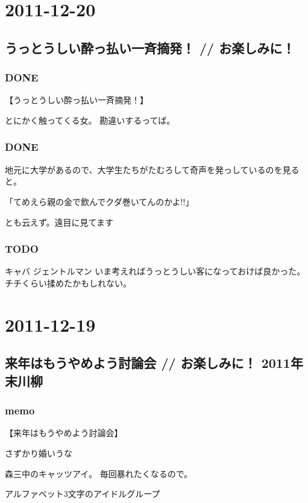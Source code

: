 \documentclass[11pt]{article}
\begin{document}
\section{2011-12-20}
\label{sec-18}
\subsection{うっとうしい酔っ払い一斉摘発！ // お楽しみに！}
\label{sec-18_1}
\subsubsection{\textbf{DONE}}
\label{sec-18_1_1}

【うっとうしい酔っ払い一斉摘発！】

とにかく触ってくる女。
勘違いするってば。
\subsubsection{\textbf{DONE}}
\label{sec-18_1_2}

地元に大学があるので、大学生たちがたむろして奇声を発っしているのを見ると。

「てめえら親の金で飲んでクダ巻いてんのかよ!!」

とも云えず。遠目に見てます
\subsubsection{\textbf{TODO}}
\label{sec-18_1_3}

キャバ
ジェントルマン
いま考えればうっとうしい客になっておけば良かった。
チチくらい揉めたかもしれない。
\section{2011-12-19}
\label{sec-19}
\subsection{来年はもうやめよう討論会 // お楽しみに！ 2011年末川柳}
\label{sec-19_1}
\subsubsection{memo}
\label{sec-19_1_1}

【来年はもうやめよう討論会】

さずかり婚いうな

森三中のキャッツアイ。
毎回暴れたくなるので。

アルファベット3文字のアイドルグループ
\end{document}

